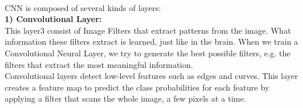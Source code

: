 \documentclass[12pt]{revtex4}
\begin{document}
\\CNN is composed of several kinds of layers:
\\\textbf{1) Convolutional Layer:}
\\This layer3 consist of Image Filters that extract patterns from the image. What information these filters extract is learned, just like in the brain. When we train a Convolutional Neural Layer, we try to generate the best possible filters, e.g. the filters that extract the most meaningful information. 
\\Convolutional layers detect low-level features such as edges and curves. This layer creates a feature map to predict the class probabilities for each feature by applying a filter that scans the whole image, a few pixels at a time.
\end{document}
